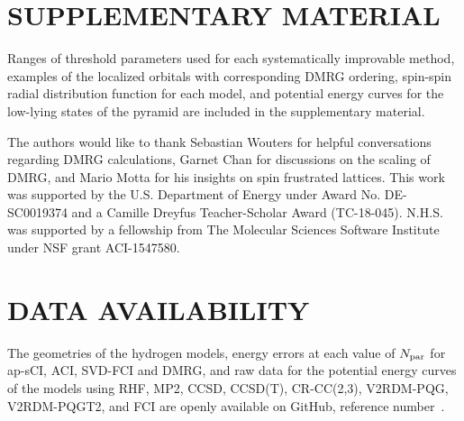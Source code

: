 \documentclass[aip,jcp,amsmath,amssymb, reprint]{revtex4-1}
\begin{document}
\section*{\label{sec:conclusions}SUPPLEMENTARY MATERIAL}
Ranges of threshold parameters used for each systematically improvable method, examples of the localized orbitals with corresponding DMRG ordering, spin-spin radial distribution function for each  model, and potential energy curves for the low-lying states of the  pyramid are included in the supplementary material.

\begin{acknowledgments}
The authors would like to thank Sebastian Wouters for helpful conversations regarding DMRG calculations, Garnet Chan for discussions on the scaling of DMRG, and Mario Motta for his insights on spin frustrated lattices. 
This work was supported by the U.S. Department of Energy under Award No. DE-SC0019374 and a Camille Dreyfus Teacher-Scholar Award (TC-18-045).
N.H.S. was supported by a fellowship from The Molecular Sciences Software Institute under NSF grant ACI-1547580.
\end{acknowledgments}

\section*{\label{sec:conclusions}DATA AVAILABILITY }
The geometries of the hydrogen models, energy errors at each value of $N_{\rm{par}}$ for ap-sCI, ACI, SVD-FCI and DMRG, and raw data for the potential energy curves of the  models using RHF, MP2, CCSD, CCSD(T), CR-CC(2,3), V2RDM-PQG, V2RDM-PQGT2, and FCI are openly available on GitHub, reference number~.


\end{document}
